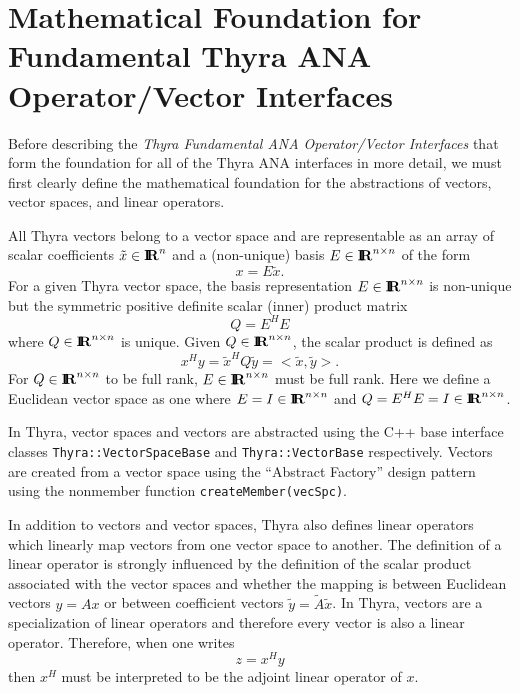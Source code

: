 \documentclass[pdf,ps2pdf,11pt]{SANDreport}
\begin{document}
%
\section{Mathematical Foundation for Fundamental Thyra ANA Operator/Vector Interfaces}
\label{thyra:sec:Thyra_math_foundation}
%

Before describing the {}\textit{Thyra Fundamental ANA Operator/Vector
Interfaces} that form the foundation for all of the Thyra ANA interfaces in
more detail, we must first clearly define the mathematical foundation for the
abstractions of vectors, vector spaces, and linear operators.

All Thyra vectors belong to a vector space and are representable as an array
of scalar coefficients $\tilde{x}\in\mbox{\textbf{I}}\hspace{-0.6ex}\mbox{\textbf{R}}^n$ and a (non-unique) basis
$E\in\mbox{\textbf{I}}\hspace{-0.6ex}\mbox{\textbf{R}}^{n\times{}n}$ of the form
%
\begin{equation}
x = E \tilde{x}.
\end{equation}
%
For a given Thyra vector space, the basis representation
$E\in\mbox{\textbf{I}}\hspace{-0.6ex}\mbox{\textbf{R}}^{n\times{}n}$ is non-unique but the symmetric positive definite
scalar (inner) product matrix
%
\begin{equation}
Q = E^H E
\end{equation}
%
where $Q\in\mbox{\textbf{I}}\hspace{-0.6ex}\mbox{\textbf{R}}^{n\times{}n}$ is unique.  Given $Q\in\mbox{\textbf{I}}\hspace{-0.6ex}\mbox{\textbf{R}}^{n\times{}n}$, the scalar product
is defined as
%
\begin{equation}
x^H y = \tilde{x}^H Q \tilde{y} = <\tilde{x},\tilde{y}>.
\end{equation}
%
For $Q\in\mbox{\textbf{I}}\hspace{-0.6ex}\mbox{\textbf{R}}^{n\times{}n}$ to be full rank, $E\in\mbox{\textbf{I}}\hspace{-0.6ex}\mbox{\textbf{R}}^{n\times{}n}$ must be
full rank.  Here we define a Euclidean vector space as one where
$E=I\in\mbox{\textbf{I}}\hspace{-0.6ex}\mbox{\textbf{R}}^{n\times{}n}$ and $Q=E^H E=I\in\mbox{\textbf{I}}\hspace{-0.6ex}\mbox{\textbf{R}}^{n\times{}n}$.

In Thyra, vector spaces and vectors are abstracted using the C++ base
interface classes {}\texttt{Thyra::\-Vector\-Space\-Base} and
{}\texttt{Thyra::\-Vector\-Base} respectively.  Vectors are created from a
vector space using the ``Abstract Factory'' design pattern using the nonmember
function {}\texttt{create\-Member(vecSpc)}.

In addition to vectors and vector spaces, Thyra also defines linear operators
which linearly map vectors from one vector space to another.  The definition of
a linear operator is strongly influenced by the definition of the scalar
product associated with the vector spaces and whether the mapping is between
Euclidean vectors $y = A x$ or between coefficient vectors $\tilde{y} =
\tilde{A} {}\tilde{x}$.
In Thyra, vectors are a specialization of linear operators and therefore every
vector is also a linear operator.  Therefore, when one writes
%
\begin{equation}
z = x^H y
\end{equation}
%
then $x^H$ must be interpreted to be the adjoint linear operator of $x$.
\end{document}
